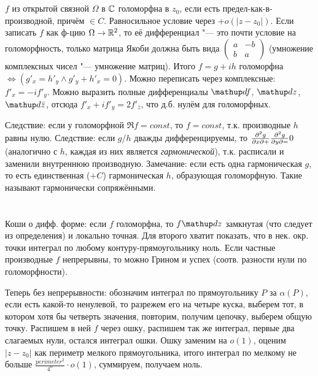 \section{} %
	$f$ из открытой связной $\Omega$ в $\mathbb{C}$ голоморфна в $z_0$, если есть предел-как-в-производной, причём $\in C$.
	Равносильное условие через $+o(|z-z_0|)$.
	Если записать $f$ как ф-цию $\Omega\to\mathbb{R}^2$, то её дифференциал "--- это почти условие на голоморфность,
	только матрица Якоби должна быть вида $\begin{pmatrix}a&-b\\b&a\end{pmatrix}$ (умножение комплексных чисел "--- умножение матриц).
	Итого $f=g+ih$ голоморфна $\iff (g'_x=h'_y \land g'_y+h'_x=0)$.
	Можно переписать через комплексные: $f'_x = -if'_y$.
	Можно выразить полные дифференциалы $\d f$, $\d z$, $\d \bar z$, отсюда
	$f'_x + if'_y=2f'_{\bar z}$, что д.б. нулём для голоморфных.

	Следствие: если у голоморфной $\Re f=const$, то $f=const$, т.к. производные $h$ равны нулю.
	Следствие: если $g$/$h$ дважды дифференцируемы, то $\frac{\partial^2 g}{\partial x\partial +}\frac{\partial^2 g}{\partial y\partial =}0$ (аналогично с $h$,
	каждая из них является \textit{гармонической}), т.к. расписали и заменили внутреннюю производную.
	Замечание: если есть одна гармоническая $g$, то есть единственная ($+C$) гармоническая $h$, образующая голоморфную.
	Такие называют гармонически сопряжёнными.

\section{} %
	Коши о дифф. форме: если $f$ голоморфна, то $f \d z$ замкнутая (что следует из определения) и локально точная.
	Для второго хватит показать, что в нек. окр. точки интеграл по любому контуру-прямоугольнику ноль.
	Если частные производные $f$ непрерывны, то можно Грином и успех (соотв. разности нули по голоморфности).

	Теперь без непрерывности: обозначим интеграл по прямоугольнику $P$ за $\alpha(P)$,
	если есть какой-то ненулевой, то разрежем его на четыре куска, выберем тот, в котором хотя бы четверть значения,
	повторим, получим цепочку, выберем общую точку.
	Распишем в ней $f$ через ошку, распишем так же интеграл, первые два слагаемых нули, остался интеграл ошки.
	Ошку заменим на $o(1)$, оценим $|z-z_0|$ как периметр мелкого прямоугольника,
	итого интеграл по мелкому не больше $\frac{perimeter^2}{4^n}\cdot o(1)$, суммируем, получаем ноль.

